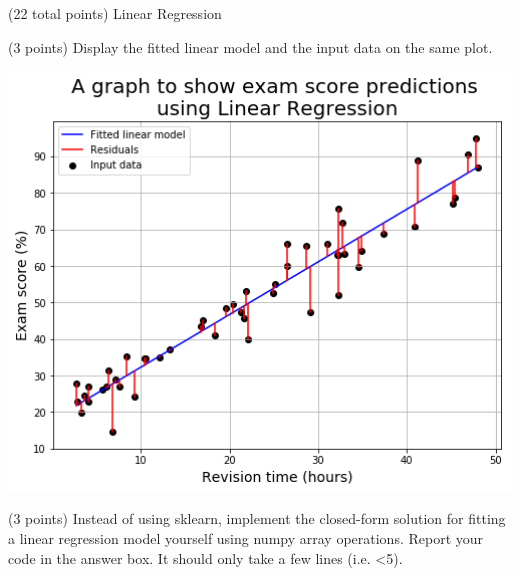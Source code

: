 \documentclass[12pt]{article}
\begin{document}
\begin{question}{(22 total points) Linear Regression}
\begin{subquestion}{(3 points) Display the fitted linear model and the input data on the same plot.
}
\begin{answerbox}{33em}
\includegraphics [width=1\textwidth]{images/q1b1.png}
\end{answerbox}



\end{subquestion}



%
%
\begin{subquestion}{(3 points) Instead of using sklearn, implement the closed-form solution for fitting a linear regression model yourself using numpy array operations.  
Report your code in the answer box.
It should only take a few lines (i.e. <5).\\ 
}



\end{subquestion}
\end{question}
\end{document}
